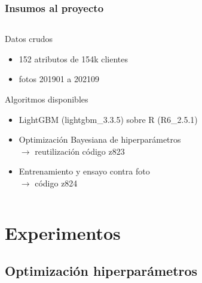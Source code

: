 \documentclass[aspectratio=169]{beamer} %
\begin{document}
\begin{frame}
  \frametitle{Insumos al proyecto}
  \begin{columns}[onlytextwidth]
    \begin{column}{.6\textwidth}
      \begin{block}{Datos crudos}
       \begin{itemize}
			    \item 152 atributos de 154k clientes
         \item fotos 201901 a 202109%
		    \end{itemize}
      \end{block}

      \begin{block}{Algoritmos disponibles}
        \begin{itemize}
			    \item LightGBM {\tiny(lightgbm\_3.3.5) } sobre R {\tiny(R6\_2.5.1)}
				  \item Optimización Bayesiana de hiperparámetros\\
			    $\rightarrow$ reutilización código z823 
			    \item Entrenamiento y ensayo contra foto\\
			    $\rightarrow$ código z824 
	    \end{itemize}
      \end{block}
    \end{column}
  \end{columns}
\end{frame}



\section{Experimentos}

\subsection{Optimización hiperparámetros}
\end{document}
